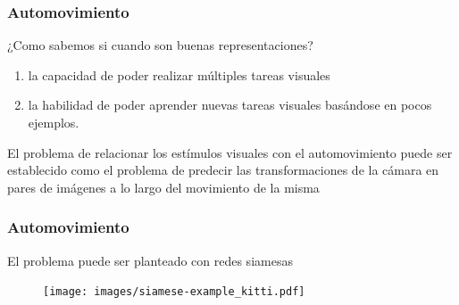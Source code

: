 \documentclass{beamer}
\begin{document}
\begin{frame}
\frametitle{Automovimiento}

¿Como sabemos si cuando son buenas representaciones?\\\pause

\vfill
\begin{enumerate}
    \item la capacidad de poder realizar múltiples tareas visuales
    \item la habilidad de poder aprender nuevas tareas visuales basándose en pocos ejemplos.
\end{enumerate}\pause
\vfill

\begin{block}{}
El problema de relacionar los estímulos visuales con el automovimiento puede ser establecido como el problema de predecir las transformaciones de la cámara en pares de imágenes a lo largo del movimiento de la misma
\end{block}
\vfill
\end{frame}




\begin{frame}[plain]
\frametitle{Automovimiento}
El problema puede ser planteado con redes siamesas\\
\vfill
\begin{figure}
    \centering
    \texttt{[image: images/siamese-example\_kitti.pdf]}
\end{figure}
\vfill
\end{frame}
\end{document}
